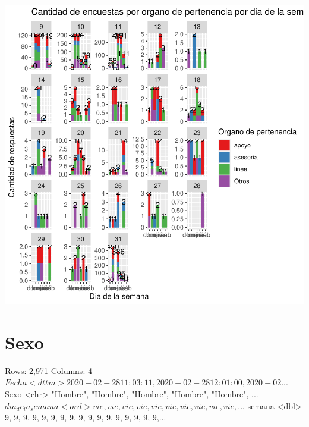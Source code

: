 \documentclass{article}
\begin{document}
\includegraphics{seguimientov5-034}

\section{Sexo}

\begin{Schunk}
\begin{Soutput}
Rows: 2,971
Columns: 4
$ Fecha            <dttm> 2020-02-28 11:03:11, 2020-02-28 12:01:00, 2020-02...
$ Sexo             <chr> "Hombre", "Hombre", "Hombre", "Hombre", "Hombre", ...
$ dia_de_la_semana <ord> vie, vie, vie, vie, vie, vie, vie, vie, vie, vie, ...
$ semana           <dbl> 9, 9, 9, 9, 9, 9, 9, 9, 9, 9, 9, 9, 9, 9, 9, 9, 9,...
\end{Soutput}
\end{Schunk}
\end{document}
